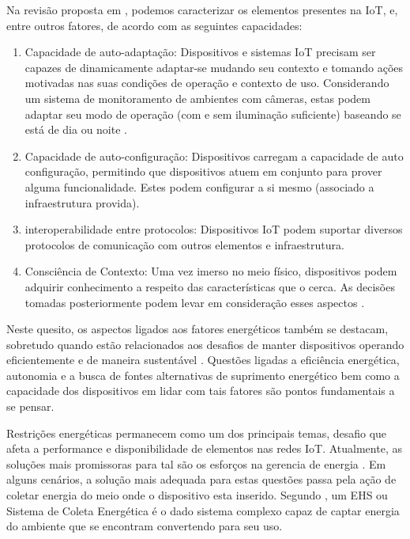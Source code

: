 Na revisão proposta em \cite{asghari_internet_2019}, podemos caracterizar os elementos presentes na \acs{IoT}, e, entre outros fatores, de acordo com as seguintes capacidades:

\begin{enumerate}
	\item Capacidade de auto-adaptação: Dispositivos e sistemas IoT precisam ser capazes de dinamicamente adaptar-se mudando seu contexto e tomando ações motivadas nas suas condições de operação e contexto de uso. Considerando um sistema de monitoramento de ambientes com câmeras, estas podem adaptar seu modo de operação (com e sem iluminação suficiente) baseando se está de dia ou noite \cite{doumenis_lightweight_2022}. 
	
	\item Capacidade de auto-configuração: Dispositivos carregam a capacidade de auto configuração, permitindo que dispositivos atuem em conjunto para prover alguma funcionalidade. Estes podem configurar a si mesmo (associado a infraestrutura provida).
	
	\item interoperabilidade entre protocolos: Dispositivos IoT podem suportar diversos protocolos de comunicação com outros elementos e infraestrutura.
	
	\item Consciência de Contexto: Uma vez imerso no meio físico, dispositivos podem adquirir conhecimento a respeito das características que o cerca. As decisões tomadas posteriormente podem levar em consideração esses aspectos \cite{yang2014health}.
\end{enumerate}

Neste quesito, os aspectos ligados aos fatores energéticos também se destacam, sobretudo quando estão relacionados aos desafios de manter dispositivos operando eficientemente e de maneira sustentável \cite{albreem_green_2017}. Questões ligadas a eficiência energética, autonomia e a busca de fontes alternativas de suprimento energético bem como a capacidade dos dispositivos em lidar com tais fatores são pontos fundamentais a se pensar. 

Restrições energéticas permanecem como um dos principais temas, desafio que afeta a performance e disponibilidade de elementos nas redes IoT. Atualmente, as soluções mais promissoras para tal são os esforços na gerencia de energia \cite{singh_survey_2020}. Em alguns cenários, a solução mais adequada para estas questões passa pela ação de coletar energia do meio onde o dispositivo esta inserido. Segundo \cite{kansal_power_2007}, um \ac{EHS} ou Sistema de Coleta Energética é o dado sistema complexo capaz de captar energia do ambiente que se encontram convertendo para seu uso.

